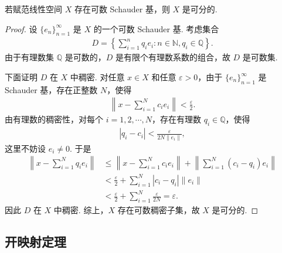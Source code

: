 \documentclass[../../main.tex]{subfiles}%
\begin{document}
\begin{proposition}
若赋范线性空间 \(X\) 存在可数 Schauder 基，则 \(X\) 是可分的.
\end{proposition}

\begin{proof}
设 \(\{e_n\}_{n=1}^{\infty}\) 是 \(X\) 的一个可数 Schauder 基. 考虑集合
\begin{align*}
D = \left\{ \sum\limits_{i=1}^{n} q_i e_i : n \in \mathbb{N}, q_i \in \mathbb{Q} \right\}.
\end{align*}
由于有理数集 \(\mathbb{Q}\) 是可数的，\(D\) 是有限个有理数系数的组合，故 \(D\) 是可数集.

下面证明 \(D\) 在 \(X\) 中稠密. 对任意 \(x \in X\) 和任意 \(\varepsilon > 0\)，由于 \(\{e_n\}_{n=1}^{\infty}\) 是 Schauder 基，存在正整数 \(N\)，使得
\begin{align*}
\left\| x - \sum\limits_{i=1}^{N} c_i e_i \right\| < \frac{\varepsilon}{2}.
\end{align*}
由有理数的稠密性，对每个 \(i = 1, 2, \cdots, N\)，存在有理数 \(q_i \in \mathbb{Q}\)，使得
\begin{align*}
|q_i - c_i| < \frac{\varepsilon}{2N \|e_i\|},
\end{align*}
这里不妨设 \(e_i \neq 0\). 于是
\begin{align*}
\left\| x - \sum\limits_{i=1}^{N} q_i e_i \right\| &\leqslant \left\| x - \sum\limits_{i=1}^{N} c_i e_i \right\| + \left\| \sum\limits_{i=1}^{N} (c_i - q_i) e_i \right\| \\
&< \frac{\varepsilon}{2} + \sum\limits_{i=1}^{N} |c_i - q_i| \|e_i\| \\
&< \frac{\varepsilon}{2} + \sum\limits_{i=1}^{N} \frac{\varepsilon}{2N} = \varepsilon.
\end{align*}
因此 \(D\) 在 \(X\) 中稠密. 综上，\(X\) 存在可数稠密子集，故 \(X\) 是可分的.
\end{proof}

\subsection{开映射定理}
\end{document}
